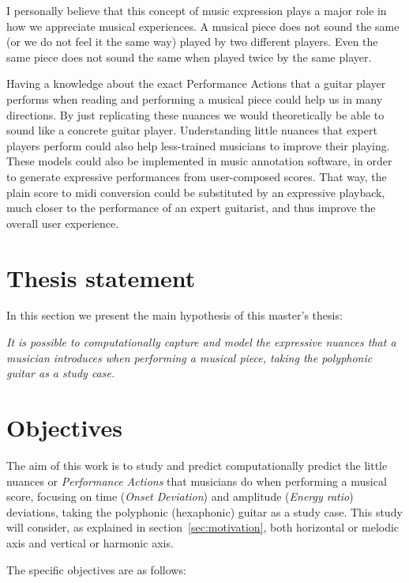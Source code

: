 I personally believe that this concept of music expression plays a major role in how we appreciate musical experiences. A musical piece does not sound the same (or we do not feel it the same way) played by two different players. Even the same piece does not sound the same when played twice by the same player. 

Having a knowledge about the exact Performance Actions that a guitar player performs when reading and performing a musical piece could help us in many directions. By just replicating these nuances we would theoretically be able to sound like a concrete guitar player. Understanding little nuances that expert players perform could also help less-trained musicians to improve their playing. These models could also be implemented in music annotation software, in order to generate expressive performances from user-composed scores. That way, the plain score to midi conversion could be substituted by an expressive playback, much closer to the performance of an expert guitarist, and thus improve the overall user experience.

\section{Thesis statement}
In this section we present the main hypothesis of this master's thesis:

\textit{It is possible to computationally capture and model the expressive nuances that a musician introduces when performing a musical piece, taking the polyphonic guitar as a study case.}


\section{Objectives}
The aim of this work is to study and predict computationally predict the little nuances or \textit{Performance Actions} that musicians do when performing a musical score, focusing on time (\textit{Onset Deviation}) and amplitude (\textit{Energy ratio}) deviations, taking the polyphonic (hexaphonic) guitar as a study case. This study will consider, as explained in section~\ref{sec:motivation}, both horizontal or melodic axis and vertical or harmonic axis.

The specific objectives are as follows:

